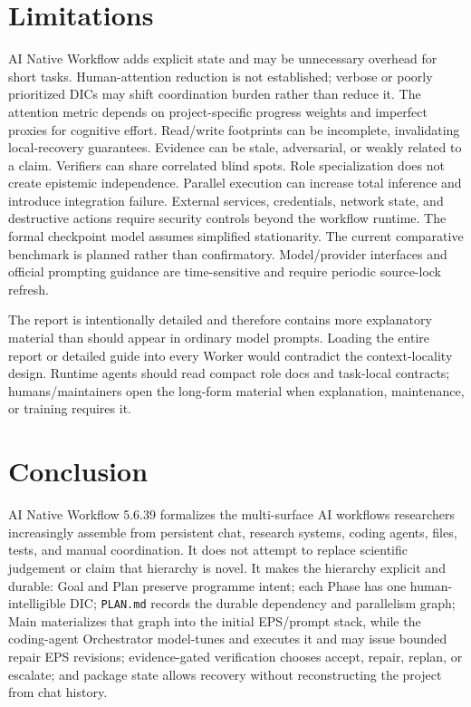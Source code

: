 \documentclass[11pt,a4paper]{article}
\begin{document}
\section{Limitations}\label{sec:limitations}
AI Native Workflow adds explicit state and may be unnecessary overhead for short tasks. Human-attention reduction is not established; verbose or poorly prioritized DICs may shift coordination burden rather than reduce it. The attention metric depends on project-specific progress weights and imperfect proxies for cognitive effort. Read/write footprints can be incomplete, invalidating local-recovery guarantees. Evidence can be stale, adversarial, or weakly related to a claim. Verifiers can share correlated blind spots. Role specialization does not create epistemic independence. Parallel execution can increase total inference and introduce integration failure. External services, credentials, network state, and destructive actions require security controls beyond the workflow runtime. The formal checkpoint model assumes simplified stationarity. The current comparative benchmark is planned rather than confirmatory. Model/provider interfaces and official prompting guidance are time-sensitive and require periodic source-lock refresh.

The report is intentionally detailed and therefore contains more explanatory material than should appear in ordinary model prompts. Loading the entire report or detailed guide into every Worker would contradict the context-locality design. Runtime agents should read compact role docs and task-local contracts; humans/maintainers open the long-form material when explanation, maintenance, or training requires it.


\section{Conclusion}\label{sec:conclusion}
AI Native Workflow 5.6.39 formalizes the multi-surface AI workflows researchers increasingly assemble from persistent chat, research systems, coding agents, files, tests, and manual coordination. It does not attempt to replace scientific judgement or claim that hierarchy is novel. It makes the hierarchy explicit and durable: Goal and Plan preserve programme intent; each Phase has one human-intelligible DIC; \texttt{PLAN.md} records the durable dependency and parallelism graph; Main materializes that graph into the initial EPS/prompt stack, while the coding-agent Orchestrator model-tunes and executes it and may issue bounded repair EPS revisions; evidence-gated verification chooses accept, repair, replan, or escalate; and package state allows recovery without reconstructing the project from chat history.
\end{document}
